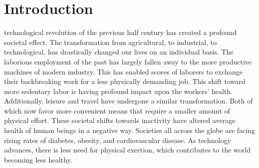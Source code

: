 \documentclass[12pt,article]{IEEEtran}
\begin{document}
	
		 
	\section{Introduction}
		 technological revolution of the previous half century has created  a profound 
		societal effect. The transformation from agricultural, to industrial, to technological, has drastically 
		changed our lives on an individual basis. The laborious employment of the past has largely fallen away 
		to the more productive machines of modern industry. This has enabled scores of laborers to exchange 
		their backbreaking work for a less physically demanding job. This shift toward more sedentary labor 
		is having profound impact upon the workers’ health. Additionally, leisure and travel have undergone 
		a similar transformation. Both of which now favor more convenient means that require a smaller amount 
		of physical effort. These societal shifts towards inactivity have altered average health of human beings 
		in a negative way. Societies all across the globe are facing rising rates of diabetes, obesity, and 
		cardiovascular disease. As technology advances, there is less need for physical exertion, which contributes 
		to the world becoming less healthy.
		
\end{document}
